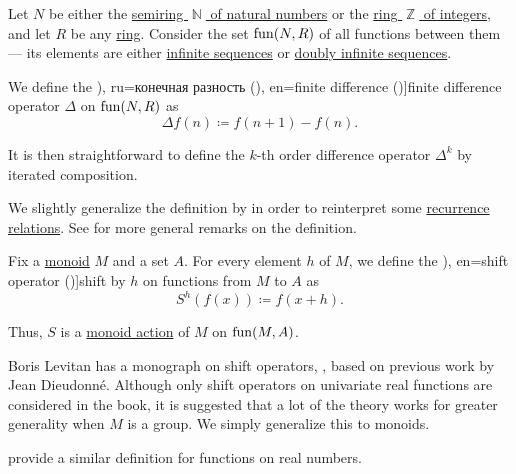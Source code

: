 \begin{definition}\label{def:finite_difference_operator}\mimprovised
  Let \( N \) be either the \hyperref[def:natural_numbers]{semiring \( \BbbN \) of natural numbers} or the \hyperref[def:integers]{ring \( \BbbZ \) of integers}, and let \( R \) be any \hyperref[def:ring]{ring}. Consider the set \( \operatorname{fun}(N, R) \) of all functions between them --- its elements are either \hyperref[def:sequence]{infinite sequences} or \hyperref[def:doubly_infinite_sequence]{doubly infinite sequences}.

  We define the \term[bg=крайна разлика от ред \( k \) (\cite[21]{Боянов2008ЧислениМетоди}), ru=конечная разность (\cite[11]{Гельфонд1959ИсчислениеКонечныхРазностей}), en=finite difference (\cite[77]{Stanley2012EnumerativeCombinatoricsVol1})]{finite difference} operator \( \Delta \) on \( \operatorname{fun}(N, R) \) as
  \begin{equation}\label{eq:def:finite_difference_operator}
    \Delta f(n) \coloneqq f(n + 1) - f(n).
  \end{equation}

  It is then straightforward to define the \( k \)-th order difference operator \( \Delta^k \) by iterated composition.
\end{definition}
\begin{comments}
  \item We slightly generalize the definition by  in order to reinterpret some \hyperref[def:recurrence_relation]{recurrence relations}. See  for more general remarks on the definition.
\end{comments}

\begin{definition}\label{def:shift_operator}\mimprovised
  Fix a \hyperref[def:monoid]{monoid} \( M \) and a set \( A \). For every element \( h \) of \( M \), we define the \term[ru=оператор сдвига (\cite[9]{Левитан1973ТеорияОператоровОбобщенногоСдвига}), en=shift operator (\cite{Stanley2012EnumerativeCombinatoricsVol1})]{shift} by \( h \) on functions from \( M \) to \( A \) as
  \begin{equation}\label{eq:def:shift_operator}
    S^h(f(x)) \coloneqq f(x + h).
  \end{equation}
\end{definition}
\begin{comments}
  \item Thus, \( S \) is a \hyperref[def:monoid_action]{monoid action} of \( M \) on \( \operatorname{fun}(M, A) \).

  \item Boris Levitan has a monograph on shift operators, \cite{Левитан1973ТеорияОператоровОбобщенногоСдвига}, based on previous work by Jean Dieudonné. Although only shift operators on univariate real functions are considered in the book, it is suggested that a lot of the theory works for greater generality when \( M \) is a group. We simply generalize this to monoids.

   provide a similar definition for functions on real numbers.
\end{comments}

